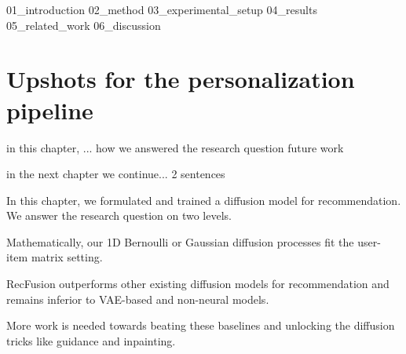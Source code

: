 

{01_introduction}
{02_method}
{03_experimental_setup}
{04_results}
{05_related_work}
{06_discussion}



%

%

%
%
%
%
%
%
%
%
%


\section{Upshots for the personalization pipeline}

in this chapter, ...
how we answered the research question
future work

in the next chapter we continue...
2 sentences
\fi

In this chapter, we formulated and trained a diffusion model for recommendation. We answer the research question on two levels.
\begin{enumerate*}[label={(\roman*)}]
\item Mathematically, our 1D Bernoulli or Gaussian diffusion processes fit the user-item matrix setting.
\item RecFusion outperforms other existing diffusion models for recommendation and remains inferior to VAE-based and non-neural models.
\end{enumerate*}
More work is needed towards beating these baselines and unlocking the diffusion tricks like guidance and inpainting.

